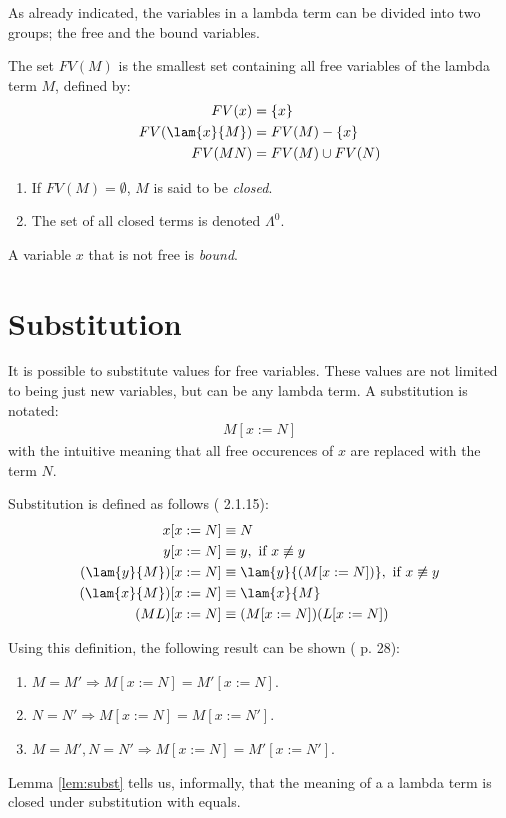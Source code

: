 As already indicated, the variables in a lambda term can be divided into
two groups; the free and the bound variables.

\begin{definition}
	The set $FV(M)$ is the smallest set containing all free variables of the lambda
	term $M$, defined by:
	\begin{align*}
		FV(x)&=\{x\} \\
		FV(\lam{x}{M})&= FV(M) - \{x\} \\
		FV(M N) &= FV(M) \cup FV(N)
	\end{align*}
\end{definition}
\begin{definition}
	\begin{enumerate}
		\item If $FV(M)=\emptyset$, $M$ is said to be \emph{closed}.
		\item The set of all closed terms is denoted $\Lambda^0$.
	\end{enumerate}
\end{definition}
\begin{definition}
	A variable $x$ that is not free is \emph{bound}.
\end{definition}

\section{Substitution}

It is possible to substitute
values for free variables. These values are not limited to being just new
variables, but can be any lambda term. A substitution is notated:
\begin{align*}
	M[x:=N]
\end{align*}
with the intuitive meaning that all free occurences of $x$ are replaced with 
the term $N$.
\begin{definition}
Substitution is defined as follows (\cite{Barendregt} 2.1.15):
\begin{align*}
	x[x:=N]&\equiv N \\
	y[x:=N]&\equiv y, \text{ if } x \not\equiv y \\
	(\lam{y}{M})[x:=N]&\equiv\lam{y}{(M[x:=N])}, \text{ if } x\not\equiv y \\
	(\lam{x}{M})[x:=N]&\equiv\lam{x}{M} \\
	(M L)[x:=N]&\equiv(M[x:=N])(L[x:=N])
\end{align*}
\end{definition}
Using this definition, the following result can be shown (\cite{Barendregt} p. 28):
\begin{lemma}\label{lem:subst}
	\begin{enumerate}
		\item $M=M'\Rightarrow M[x:=N]=M'[x:=N]$.
		\item $N=N'\Rightarrow M[x:=N]=M[x:=N']$.
		\item $M=M', N=N'\Rightarrow M[x:=N]=M'[x:=N']$.
	\end{enumerate}
\end{lemma}
Lemma \ref{lem:subst} tells us, informally, that the meaning of a a lambda term
is closed under substitution with equals.

